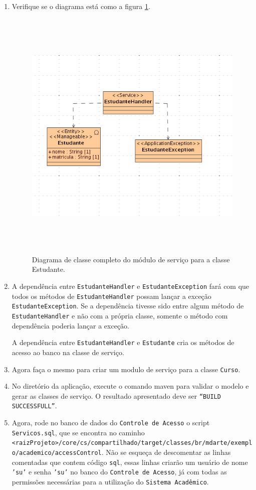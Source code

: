 \begin{enumerate}
\item Verifique se o diagrama está como a figura
\ref{resultado_diagrama_classe_servico}.
\begin{figure}[H]
	\centering
	\includegraphics[width=360pt,height=350pt]{imgs/tutorial-mdarte-0011.png}
	\caption{Diagrama de classe completo do módulo de serviço para a classe
	Estudante.}
	\label{resultado_diagrama_classe_servico}
\end{figure}

\item A dependência entre \texttt{EstudanteHandler} e
\texttt{EstudanteException} fará com que todos os métodos de
\texttt{EstudanteHandler} possam lançar a exceção \texttt{EstudanteException}.
Se a dependência tivesse sido entre algum método de \texttt{EstudanteHandler} e
não com a própria classe, somente o método com dependência poderia lançar a
exceção.

A dependência entre \texttt{EstudanteHandler} e \texttt{Estudante} cria os
métodos de acesso ao banco na classe de serviço.

\item Agora faça o mesmo para criar um modulo de serviço para a classe
\texttt{Curso}.
	
\item No diretório da aplicação, execute o comando maven para validar o modelo e
gerar as classes de serviço. O resultado apresentado deve ser \texttt{“BUILD
SUCCESSFULL”}.

\item Agora, rode no banco de dados do \texttt{Controle de Acesso} o script
\texttt{Servicos.sql}, que se encontra no caminho
\texttt{<raizProjeto>/core/cs/compartilhado/target/classes/br/mdarte/exemplo/academico/accessControl}.
Não se esqueça de descomentar as linhas comentadas que contem código
\texttt{sql}, essas linhas criarão um usuário de nome \texttt{'su'} e senha
\texttt{'su'} no banco do \texttt{Controle de Acesso}, já com todas as
permissões necessárias para a utilização do \texttt{Sistema Acadêmico}.

\end{enumerate}


